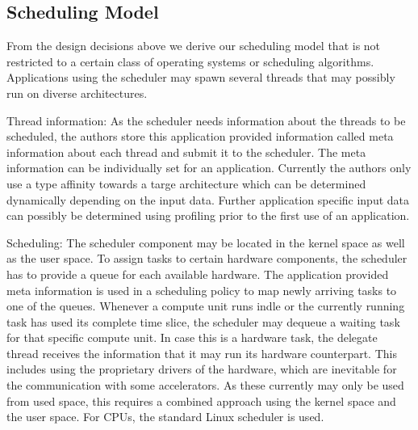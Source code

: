 \documentclass[a4paper,13pt]{article}
\begin{document}
\begin{multicols}{2}
\subsection{Scheduling Model}

From the design decisions above we derive our scheduling model that is not restricted to a certain 
class of operating systems or scheduling algorithms. Applications using the scheduler may spawn 
several threads that may possibly run on diverse architectures.

Thread information: As the scheduler needs information about the threads to be scheduled, the authors
store this application provided information called meta information about each thread and submit it 
to the scheduler. The meta information can be individually set for an application. Currently the 
authors only use a type affinity towards a targe architecture which can be determined dynamically
depending on  the input data. Further application specific input data can possibly be determined 
using profiling prior to the first use of an application.

Scheduling: The scheduler component may be located in the kernel space as well as the user space. To
assign tasks to certain hardware components, the scheduler has to provide a queue for each available
hardware. The application provided meta information is used in a scheduling policy to map newly 
arriving tasks to one of the queues. Whenever a compute unit runs indle or the currently running 
task has used  its complete time slice, the scheduler may dequeue a waiting task for that specific
compute unit. In case this is a hardware task, the delegate thread receives the information that it
may run its hardware counterpart. This includes using   the proprietary drivers of the hardware, which
are inevitable for the communication with some accelerators. As these currently may only be used from
used space, this requires a combined approach using the kernel space and the user space. For CPUs, 
the standard Linux scheduler is used.


\end{multicols}
\end{document}
